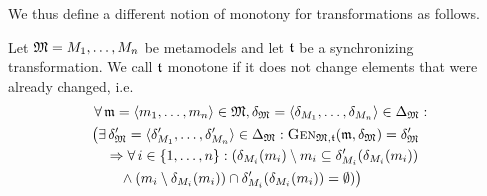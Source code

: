 We thus define a different notion of monotony for transformations as follows.
\begin{definition}
    \label{def:monotonetransformation}
    Let $\mathfrak{M} = M_{1}, \dots, M_{n}$ be metamodels and let $\mathfrak{t}$ be a synchronizing transformation. We call $\mathfrak{t}$ monotone if it does not change elements that were already changed, i.e.
    \begin{align*}
        &
        \forall \modeltuple{m} = \tupled{\model{m}{1}, \dots, \model{m}{n}} \in \metamodeltuple{M}, \changetuple{\metamodeltuple{M}} = \tupled{\change{\metamodel{M}{1}}, \dots, \change{\metamodel{M}{n}}} \in \changeuniverse{\metamodeltuple{M}} : \\
        &
        \bigl(\exists \changetuple{\metamodeltuple{M}}' = \tupled{\change{\metamodel{M}{1}}', \dots, \change{\metamodel{M}{n}}'} \in \changeuniverse{\metamodeltuple{M}} : \generalizationfunction{\metamodeltuple{M},\transformation{t}}(\modeltuple{m}, \changetuple{\metamodeltuple{M}}) = \changetuple{\metamodeltuple{M}}' \\
        & \formulaskip
        \Rightarrow
        \forall i \in \setted{1, \dots, n} : 
        (\change{\metamodel{M}{i}}(\model{m}{i}) \setminus \model{m}{i} \subseteq \change{\metamodel{M}{i}}'(\change{\metamodel{M}{i}}(\model{m}{i})) \\
        & \formulaskip\formulaskip
        \land
        (\model{m}{i} \setminus \change{\metamodel{M}{i}}(\model{m}{i})) \cap \change{\metamodel{M}{i}}'(\change{\metamodel{M}{i}}(\model{m}{i})) = \emptyset)
        \bigr)
    \end{align*}
\end{definition}

